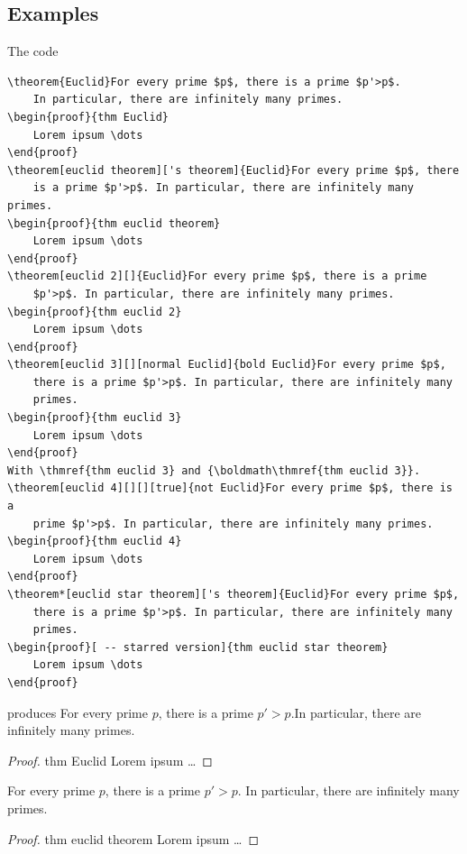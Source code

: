 \documentclass[12pt, babellanguage=british, titlespace, defaulttheorems]{altarticle}
\begin{document}
\subsection{Examples}
The code
\begin{verbatim}
\theorem{Euclid}For every prime $p$, there is a prime $p'>p$.
    In particular, there are infinitely many primes.
\begin{proof}{thm Euclid}
    Lorem ipsum \dots
\end{proof}
\theorem[euclid theorem]['s theorem]{Euclid}For every prime $p$, there
    is a prime $p'>p$. In particular, there are infinitely many primes.
\begin{proof}{thm euclid theorem}
    Lorem ipsum \dots
\end{proof}
\theorem[euclid 2][]{Euclid}For every prime $p$, there is a prime
    $p'>p$. In particular, there are infinitely many primes.
\begin{proof}{thm euclid 2}
    Lorem ipsum \dots
\end{proof}
\theorem[euclid 3][][normal Euclid]{bold Euclid}For every prime $p$,
    there is a prime $p'>p$. In particular, there are infinitely many
    primes.
\begin{proof}{thm euclid 3}
    Lorem ipsum \dots
\end{proof}
With \thmref{thm euclid 3} and {\boldmath\thmref{thm euclid 3}}.
\theorem[euclid 4][][][true]{not Euclid}For every prime $p$, there is a
    prime $p'>p$. In particular, there are infinitely many primes.
\begin{proof}{thm euclid 4}
    Lorem ipsum \dots
\end{proof}
\theorem*[euclid star theorem]['s theorem]{Euclid}For every prime $p$,
    there is a prime $p'>p$. In particular, there are infinitely many
    primes.
\begin{proof}[ -- starred version]{thm euclid star theorem}
    Lorem ipsum \dots
\end{proof}
\end{verbatim}
produces
For every prime $p$, there is a prime $p'>p$.In particular, there are infinitely many primes.
\begin{proof}{thm Euclid}
    Lorem ipsum \dots
\end{proof}
For every prime $p$, there is a prime $p'>p$. In particular, there are infinitely many primes.
\begin{proof}{thm euclid theorem}
    Lorem ipsum \dots
\end{proof}
\end{document}
